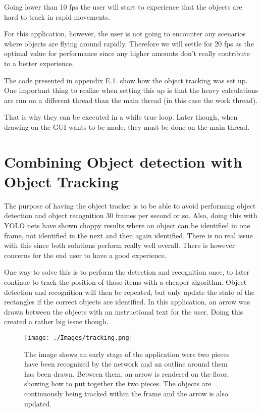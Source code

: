 Going lower than 10 fps the user will start to experience that the objects are hard to track 
in rapid movements.

For this application, however, the user is not going to encounter any scenarios where 
objects are flying around rapidly. Therefore we will settle for 20 fps as the optimal value 
for performance since any higher amounts don't really contribute to a better experience.

The code presented in appendix E.1. show how the object tracking was set up. One important thing to realize when setting this up is that the heavy calculations are run on a different thread than the main thread (in this case the work thread). 

That is why they can be executed in a while true loop. Later though, when drawing on the GUI wants to be made, they must be done on the main thread.



\section{Combining Object detection with Object Tracking}
The purpose of having the object tracker is to be able to avoid performing object detection and object recognition 30 frames per second or so. Also, doing this with YOLO nets have shown choppy results where an object can be identified in one frame, not identified in the next and then again identified.
There is no real issue with this since both solutions perform really well overall. There is however concerns for the end user to have a good experience.

One way to solve this is to perform the detection and recognition once, to later continue to track the position of those items with a cheaper algorithm.
Object detection and recognition will then be repeated, but only update the state of the rectangles if the correct objects are identified.
In this application, an arrow was drawn between the objects with an instructional text for the user. Doing this created a rather big issue though.

\begin{figure}[!hbtp]
\begin{center}
\texttt{[image: ./Images/tracking.png]}
\caption{The image shows an early stage of the application were two pieces have been recognized by the network and an outline around them has been drawn. Between them, an arrow is rendered on the floor, showing how to put together the two pieces. The objects are continuously being tracked within the frame and the arrow is also updated.}
\label{fig:tracking}
\end{center}
\end{figure}


